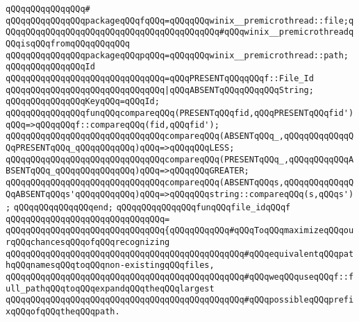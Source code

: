 \verb|qQQqqQQqqQQqqQQq#|\newline
\verb|qQQqqQQqqQQqqQQqpackageqQQqfqQQq=qQQqqQQqwinix__premicrothread::file;qQQqqQQqqQQqqQQqqQQqqQQqqQQqqQQqqQQqqQQqqQQq#qQQqwinix__premicrothreadqQQqisqQQqfromqQQqqQQqqQQq|\newline
\verb|qQQqqQQqqQQqqQQqpackageqQQqpqQQq=qQQqqQQqwinix__premicrothread::path;|\newline
\newline
\verb|qQQqqQQqqQQqqQQqId|\newline
\verb|qQQqqQQqqQQqqQQqqQQqqQQqqQQqqQQq=qQQqPRESENTqQQqqQQqf::File_Id|\newline
\verb|qQQqqQQqqQQqqQQqqQQqqQQqqQQqqQQq|\verb#|qQQqABSENTqQQqqQQqqQQqString;#\newline
\newline
\verb|qQQqqQQqqQQqqQQqKeyqQQq=qQQqId;|\newline
\newline
\verb|qQQqqQQqqQQqqQQqfunqQQqcompareqQQq(PRESENTqQQqfid,qQQqPRESENTqQQqfid')qQQq=>qQQqqQQqf::compareqQQq(fid,qQQqfid');|\newline
\verb|qQQqqQQqqQQqqQQqqQQqqQQqqQQqqQQqcompareqQQq(ABSENTqQQq_,qQQqqQQqqQQqqQQqPRESENTqQQq_qQQqqQQqqQQq)qQQq=>qQQqqQQqLESS;|\newline
\verb|qQQqqQQqqQQqqQQqqQQqqQQqqQQqqQQqcompareqQQq(PRESENTqQQq_,qQQqqQQqqQQqABSENTqQQq_qQQqqQQqqQQqqQQq)qQQq=>qQQqqQQqGREATER;|\newline
\verb|qQQqqQQqqQQqqQQqqQQqqQQqqQQqqQQqcompareqQQq(ABSENTqQQqs,qQQqqQQqqQQqqQQqABSENTqQQqs'qQQqqQQqqQQq)qQQq=>qQQqqQQqstring::compareqQQq(s,qQQqs');|\newline
\verb|qQQqqQQqqQQqqQQqend;|\newline
\newline
\verb|qQQqqQQqqQQqqQQqfunqQQqfile_idqQQqf|\newline
\verb|qQQqqQQqqQQqqQQqqQQqqQQqqQQqqQQq=|\newline
\verb|qQQqqQQqqQQqqQQqqQQqqQQqqQQqqQQq{qQQqqQQqqQQq#qQQqToqQQqmaximizeqQQqourqQQqchancesqQQqofqQQqrecognizing|\newline
\verb|qQQqqQQqqQQqqQQqqQQqqQQqqQQqqQQqqQQqqQQqqQQqqQQq#qQQqequivalentqQQqpathqQQqnamesqQQqtoqQQqnon-existingqQQqfiles,|\newline
\verb|qQQqqQQqqQQqqQQqqQQqqQQqqQQqqQQqqQQqqQQqqQQqqQQq#qQQqweqQQquseqQQqf::full_pathqQQqtoqQQqexpandqQQqtheqQQqlargest|\newline
\verb|qQQqqQQqqQQqqQQqqQQqqQQqqQQqqQQqqQQqqQQqqQQqqQQq#qQQqpossibleqQQqprefixqQQqofqQQqtheqQQqpath.|\newline

